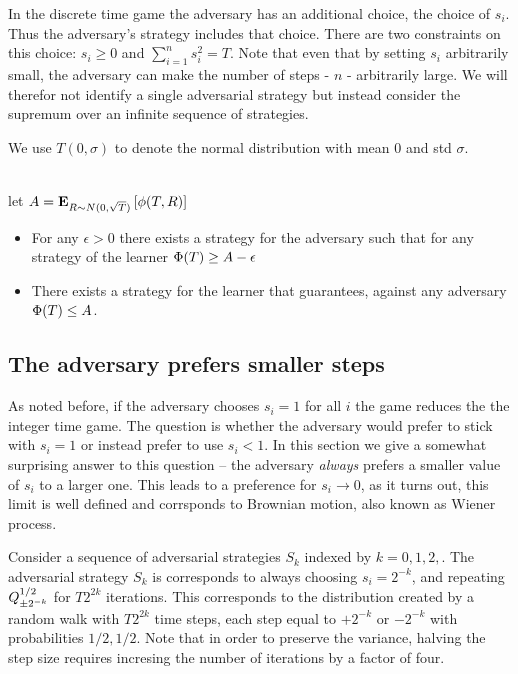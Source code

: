 \documentclass{article}[12pt]
\begin{document}
In the discrete time game the adversary has an additional choice, the
choice of $s_i$. Thus the adversary's strategy includes that choice.
There are two constraints on this choice: $s_i \geq 0$ and
$\sum_{i=1}^n s_i^2 = T$. Note that even that by setting $s_i$
arbitrarily small, the adversary can make the number of steps - $n$ -
arbitrarily large. We will therefor not identify a single adversarial
strategy but instead consider the supremum over an infinite sequence
of strategies.

We use $T(0,\sigma)$ to denote the normal distribution with mean 0 and
std $\sigma$.

\begin{theorem}
  ~\\

   let $A = {\bf E}_{R \sim N(0,\sqrt{T})}\left[ \phi(T,R) \right]$
   \begin{itemize}
     \item
    For any $\epsilon>0$ there exists a strategy for the adversary
    such that for any strategy of the learner $\Phi(T) \geq A-\epsilon$
  \item
    There exists a strategy for the learner that guarantees, against
    any adversary $\Phi(T) \leq A$.
  \end{itemize}
\end{theorem}


\subsection{The adversary prefers smaller steps} \label{sec:smallsteps}
As noted before, if the adversary chooses $s_i=1$ for all $i$ the game
reduces the the integer time game. The question is whether the
adversary would prefer to stick with $s_i=1$ or instead prefer to use
$s_i<1$. In this section we give a somewhat surprising answer to this question
-- the adversary {\em always} prefers a smaller value of $s_i$ to a larger
one. This leads to a preference for $s_i \to 0$, as it turns out, this
limit is well defined and corrsponds to Brownian motion, also known as
Wiener process.

Consider a sequence of adversarial strategies $S_k$ indexed by
$k=0,1,2,$. The adversarial strategy $S_k$ is corresponds to always
choosing $s_i = 2^{-k}$, and repeating  $Q^{1/2}_{\pm 2^{-k}}$ 
for $T 2^{2k}$ iterations.
This corresponds to the distribution created by a random walk with
$T 2^{2k}$ time steps, each step equal to $+2^{-k}$ or  $-2^{-k}$ with probabilities $1/2,1/2$.
Note that in order to preserve the variance, halving the step size
requires incresing the number of iterations by a factor of four.
\end{document}
